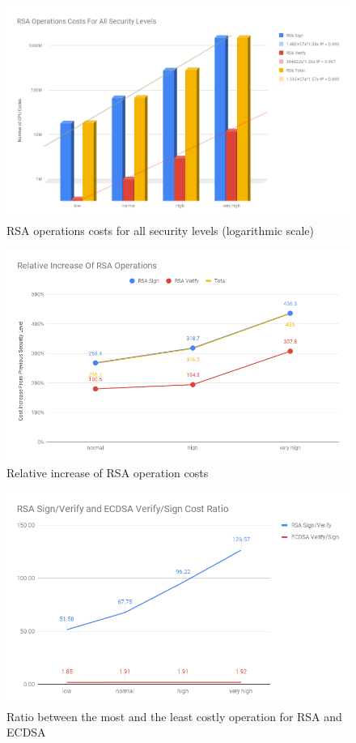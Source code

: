 \documentclass{llncs}
\begin{document}
\begin{figure}
  \centering
  \includegraphics[width=1.0\textwidth]{img/rsa_cost_all_sls.png}
  \centering \caption{\label{fig:rsa-costs-all-sls} RSA operations costs for all security levels (logarithmic scale)}
\end{figure}

\begin{figure}
  \centering
  \includegraphics[width=1.0\textwidth]{img/rsa_relative_increase.png}
  \centering \caption{\label{fig:rsa-pub-priv-cost-increase} Relative increase of RSA operation costs}
\end{figure}

\begin{figure}
  \centering
  \includegraphics[width=1.0\textwidth]{img/rsa_ecdsa_operation_ratio.png}
  \centering \caption{\label{fig:rsa-ecdsa-pub-priv-ratio} Ratio between the most and the least costly operation for RSA and ECDSA}
\end{figure}
\end{document}
